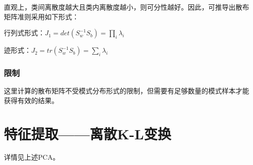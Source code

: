 \documentclass[12pt, letterpaper]{article}
\begin{document}
直观上，类间离散度越大且类内离散度越小，则可分性越好。因此，可推导出散布矩阵准则采用如下形式：

行列式形式：$J_1=det(S_w^{-1}S_b)=\prod_i\lambda_i$

迹形式：$J_2=tr(S_w^{-1}S_b)=\sum_i\lambda_i$

\subsubsection*{限制}
这里计算的散布矩阵不受模式分布形式的限制，但需要有足够数量的模式样本才能获得有效的结果。

\section{特征提取——离散K-L变换}
详情见上述PCA。
\end{document}
